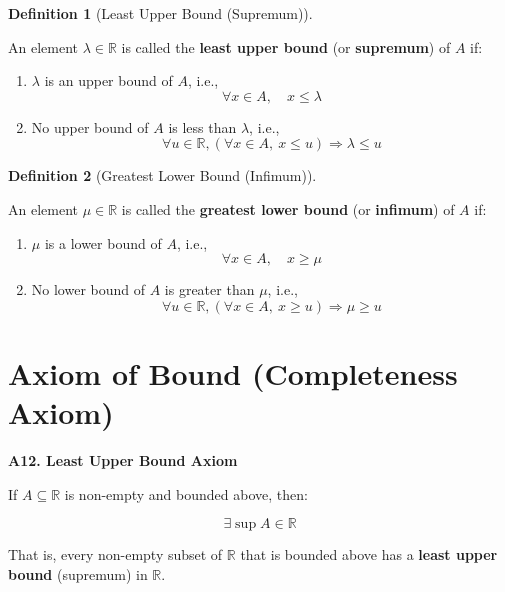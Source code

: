 \documentclass[
]{book}
\providecommand{\tightlist}{%
  \setlength{\itemsep}{0pt}\setlength{\parskip}{0pt}}
\theoremstyle{definition}
\newtheorem{definition}{Definition}[chapter]
\theoremstyle{definition}
\theoremstyle{definition}
\theoremstyle{definition}
\theoremstyle{remark}
\begin{document}
\begin{definition}[Least Upper Bound (Supremum)]
\protect\hypertarget{def:unnamed-chunk-111}{}\label{def:unnamed-chunk-111}

An element \(\lambda \in \mathbb{R}\) is called the \textbf{least upper bound} (or \textbf{supremum}) of \(A\) if:

\begin{enumerate}
\def\labelenumi{\arabic{enumi}.}
\tightlist
\item
  \(\lambda\) is an upper bound of \(A\), i.e.,
  \[
  \forall x \in A, \quad x \leq \lambda
  \]
\item
  No upper bound of \(A\) is less than \(\lambda\), i.e.,
  \[
  \forall u \in \mathbb{R}, \left( \forall x \in A, \ x \leq u \right) \Rightarrow \lambda \leq u
  \]
\end{enumerate}

\end{definition}

\begin{definition}[Greatest Lower Bound (Infimum)]
\protect\hypertarget{def:unnamed-chunk-112}{}\label{def:unnamed-chunk-112}

An element \(\mu \in \mathbb{R}\) is called the \textbf{greatest lower bound} (or \textbf{infimum}) of \(A\) if:

\begin{enumerate}
\def\labelenumi{\arabic{enumi}.}
\tightlist
\item
  \(\mu\) is a lower bound of \(A\), i.e.,
  \[
  \forall x \in A, \quad x \geq \mu
  \]
\item
  No lower bound of \(A\) is greater than \(\mu\), i.e.,
  \[
  \forall u \in \mathbb{R}, \left( \forall x \in A, \ x \geq u \right) \Rightarrow \mu \geq u
  \]
\end{enumerate}

\end{definition}

\section{Axiom of Bound (Completeness Axiom)}\label{axiom-of-bound-completeness-axiom}

\textbf{A12. Least Upper Bound Axiom}

If \(A \subseteq \mathbb{R}\) is non-empty and bounded above, then:

\[
\exists \sup A \in \mathbb{R}
\]

That is, every non-empty subset of \(\mathbb{R}\) that is bounded above has a \textbf{least upper bound} (supremum) in \(\mathbb{R}\).
\end{document}
